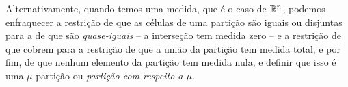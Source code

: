 Alternativamente, quando temos uma medida, que é o caso de $\mathbb{R}^n$, podemos enfraquecer a restrição de que as células de uma partição são iguais ou disjuntas para a de que são \emph{quase-iguais} \--- a interseção tem medida zero \--- e a restrição de que cobrem para a restrição de que a união da partição tem medida total, e por fim, de que nenhum elemento da partição tem medida nula, e definir que isso é uma $\mu$-partição ou \emph{partição com respeito a $\mu$}.











